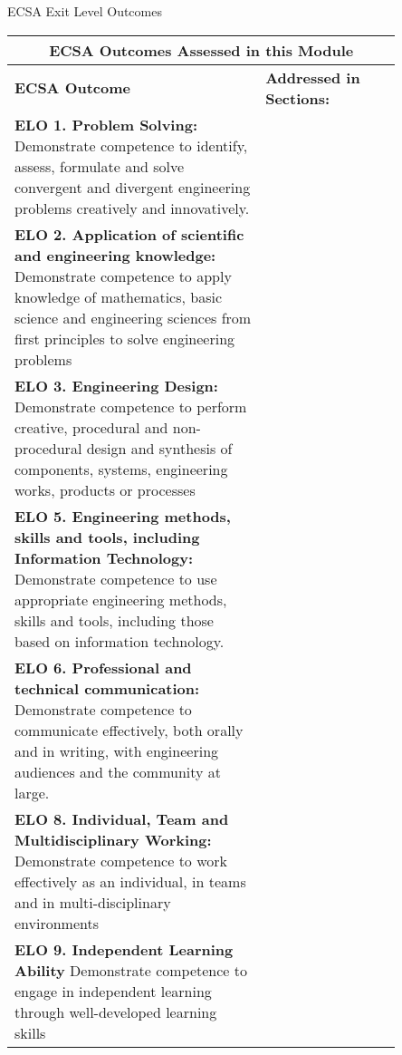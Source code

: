 \begin{Summary}{ECSA Exit Level Outcomes}
\begin{tabular}{|p{0.55\linewidth}|p{0.3\linewidth}|}
	\hline
	\multicolumn{2}{|c|}{\textbf{ECSA Outcomes Assessed in this Module}} \\
	\hline
	\textbf{ECSA Outcome} & \textbf{Addressed in Sections:} \\
	\hline
	\textbf{ELO 1. Problem Solving:} Demonstrate competence to identify, assess, formulate and solve convergent and divergent engineering problems creatively and innovatively. & \\%
	\hline
	\textbf{ELO 2. Application of scientific and engineering knowledge:} Demonstrate
	competence to apply knowledge of mathematics,
	basic science and engineering sciences from first
	principles to solve engineering problems & \\%
	\hline
	\textbf{ELO 3. Engineering Design:} Demonstrate
	competence to perform creative, procedural and
	non-procedural design and synthesis of
	components, systems, engineering works,
	products or processes& \\%
	\hline
	\textbf{ELO 5. Engineering methods, skills and tools,
		including Information Technology:} Demonstrate competence to use appropriate
	engineering methods, skills and tools, including
those based on information technology. & \\%
	\hline
	\textbf{ELO 6. Professional and technical
		communication: } Demonstrate competence to
	communicate effectively, both orally and in
writing, with engineering audiences and the
community at large. & \\%
	\hline
	\textbf{ELO 8. Individual, Team and
		Multidisciplinary Working:} Demonstrate
	competence to work effectively as an individual,
in teams and in multi-disciplinary environments & \\%
	\hline
	\textbf{ELO 9. Independent Learning Ability} Demonstrate competence to engage in
	independent learning through well-developed
	learning skills& \\%
	\hline
	\end{tabular}
\end{Summary}